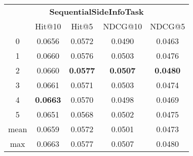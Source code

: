 \documentclass{article}
\begin{document}
 

\begin{tabular}{c|cccc}

\multicolumn{5}{c}{\textbf{SequentialSideInfoTask}} \\
\noalign{\smallskip}
\noalign{\smallskip}
\toprule
\multicolumn{1}{c}{Template ID} & \multicolumn{1}{|c}{Hit@10} & \multicolumn{1}{c}{Hit@5} & \multicolumn{1}{c}{NDCG@10} & \multicolumn{1}{c}{NDCG@5} \\
\midrule
0 & 0.0656 & 0.0572 & 0.0490 & 0.0463 \\
1 & 0.0660 & 0.0576 & 0.0503 & 0.0476 \\
2 & 0.0660 & \textbf{0.0577} & \textbf{0.0507} & \textbf{0.0480} \\
3 & 0.0661 & 0.0571 & 0.0503 & 0.0474 \\
4 & \textbf{0.0663} & 0.0570 & 0.0498 & 0.0469 \\
5 & 0.0651 & 0.0568 & 0.0502 & 0.0475 \\
\midrule
mean & 0.0659 & 0.0572 & 0.0501 & 0.0473 \\
max & 0.0663 & 0.0577 & 0.0507 & 0.0480 \\
\bottomrule

\end{tabular}
\end{document}
